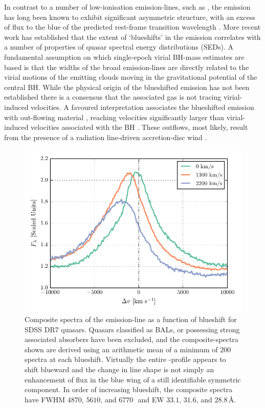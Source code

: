 In contrast to a number of low-ionisation emission-lines, such as , the  emission has long been known to exhibit significant asymmetric structure, with an excess of flux to the blue of the predicted rest-frame transition wavelength \citep{gaskell82}. 
More recent work \citep[e.g.][]{sulentic00a, richards11} has established that the extent of `blueshifts' in the  emission correlates with a number of properties of quasar spectral energy distributions (SEDs). 
A fundamental assumption on which single-epoch virial BH-mass estimates are based is that the widths of the broad emission-lines are directly related to the virial motions of the emitting clouds moving in the gravitational potential of the central BH. 
While the physical origin of the blueshifted emission has not been established there is a consensus that the associated gas is not tracing virial-induced velocities.  
A favoured interpretation associates the blueshifted emission with out-flowing material \citep[see][for a recent review]{netzer15}, reaching velocities significantly larger than virial-induced velocities associated with the BH \citep[e.g.][]{sulentic07, richards11}.
These outflows, most likely, result from the presence of a radiation line-driven accretion-disc wind \citep[e.g.][]{konigl94, murray95, proga00, everett05, gallagher15,higginbottom15}.  

\begin{figure}[h!]
    \centering
    \includegraphics[width=0.9\linewidth]{figures/chapter03/civ_composites.pdf}
    \caption[{Composite spectra of the  emission-line as a function of  blueshift for SDSS DR7 quasars.}]{Composite spectra of the  emission-line as a function of  blueshift for SDSS DR7 quasars. Quasars classified as BALs, or possessing strong associated absorbers have been excluded, and the composite-spectra shown are derived using an arithmetic mean of a minimum of $200$ spectra at each blueshift. Virtually the entire -profile appears to shift blueward and the change in line shape is not simply an enhancement of flux in the blue wing of a still identifiable symmetric component. In order of increasing  blueshift, the composite spectra have FWHM $4870$, $5610$, and $6770$\,\kms\, and EW $33.1$, $31.6$, and $28.8$\,\AA.}
    \label{fig:civ_composites}
\end{figure}

